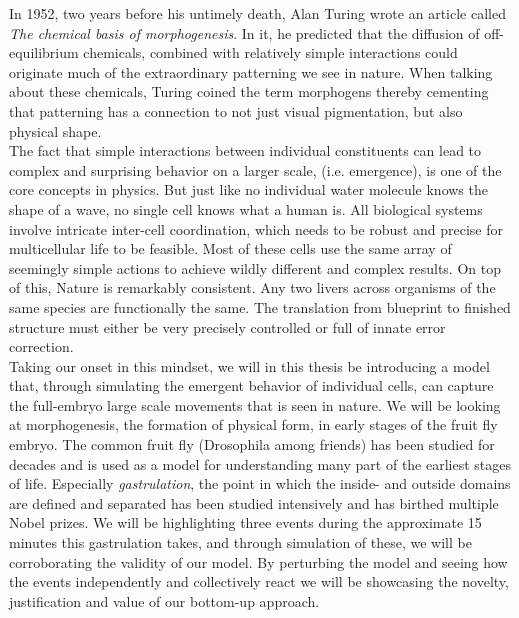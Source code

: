 
In 1952, two years before his untimely death, Alan Turing wrote an article called \textit{The chemical basis of morphogenesis}.\cite{turing52the} In it, he predicted that the diffusion of off-equilibrium chemicals, combined with relatively simple interactions could originate much of the extraordinary patterning we see in nature. When talking about these chemicals, Turing coined the term morphogens thereby cementing that patterning has a connection to not just visual pigmentation, but also physical shape. \\


The fact that simple interactions between individual constituents can lead to complex and surprising behavior on a larger scale, (i.e. emergence), is one of the core concepts in physics. But just like no individual water molecule knows the shape of a wave, no single cell knows what a human is. All biological systems involve intricate inter-cell coordination, which needs to be robust and precise for multicellular life to be feasible. Most of these cells use the same array of seemingly simple actions to achieve wildly different and complex results. On top of this, Nature is remarkably consistent. Any two livers across organisms of the same species are functionally the same. The translation from blueprint to finished structure must either be very precisely controlled or full of innate error correction. \\

Taking our onset in this mindset, we will in this thesis be introducing a model that, through simulating the emergent behavior of individual cells, can capture the full-embryo large scale movements that is seen in nature. We will be looking at morphogenesis, the formation of physical form, in early stages of the fruit fly embryo. The common fruit fly (Drosophila among friends) has been studied for decades and is used as a model for understanding many part of the earliest stages of life. Especially \textit{gastrulation}, the point in which the inside- and outside domains are defined and separated has been studied intensively and has birthed multiple Nobel prizes. We will be highlighting three events during the approximate 15 minutes this gastrulation takes, and through simulation of these, we will be corroborating the validity of our model. By perturbing the model and seeing how the events independently and collectively react we will be showcasing the novelty, justification and value of our bottom-up approach.\\

